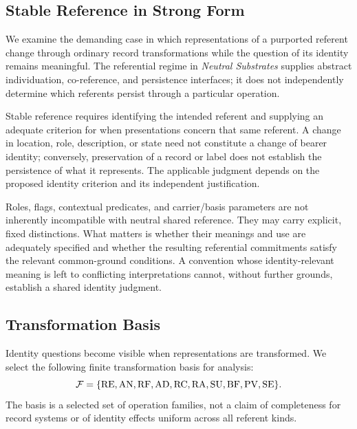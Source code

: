 \subsection{Stable Reference in Strong Form}
\label{subsec:stable_reference_strong}

We examine the demanding case in which representations of a purported
referent change through ordinary record transformations while the question
of its identity remains meaningful.
The referential regime in
\emph{Neutral Substrates} supplies abstract individuation, co-reference,
and persistence interfaces; it does not independently determine which
referents persist through a particular operation.

Stable reference requires identifying the intended referent and supplying
an adequate criterion for when presentations concern that same referent.
A change in location, role, description, or state need not constitute a
change of bearer identity; conversely, preservation of a record or label
does not establish the persistence of what it represents.
The applicable judgment depends on the proposed identity criterion and
its independent justification.

Roles, flags, contextual predicates, and carrier/basis parameters are not
inherently incompatible with neutral shared reference.
They may carry
explicit, fixed distinctions.
What matters is whether their meanings and
use are adequately specified and whether the resulting referential
commitments satisfy the relevant common-ground conditions.
A convention whose identity-relevant meaning
is left to conflicting interpretations
cannot, without further grounds, establish a shared identity judgment.

\subsection{Transformation Basis}
\label{subsec:transformation_basis}

Identity questions become visible when representations are transformed.
We select the following finite transformation basis for analysis:
\[
  \mathcal{F} =
  \{\mathrm{RE},\mathrm{AN},\mathrm{RF},\mathrm{AD},\mathrm{RC},
  \mathrm{RA},\mathrm{SU},\mathrm{BF},\mathrm{PV},\mathrm{SE}\}.
\]
The basis is a selected set of operation families, not a claim of
completeness for record systems or of identity effects uniform across
all referent kinds.

